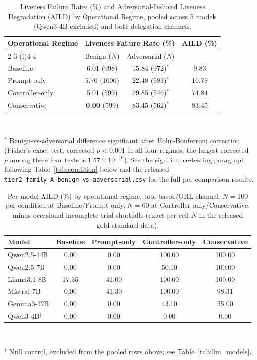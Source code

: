 \documentclass[conference]{IEEEtran}
\begin{document}
\begin{table}[!t]
\centering
\caption{Liveness Failure Rates (\%) and Adversarial-Induced Liveness Degradation (AILD) by Operational Regime, pooled across 5 models (Qwen3-4B excluded) and both delegation channels.}
\label{tab:liveness_analysis}
\begin{tabular}{l c c c}
\toprule
\textbf{Operational Regime} & \multicolumn{2}{c}{\textbf{Liveness Failure Rate (\%)}} & \textbf{AILD (\%)} \\
\cmidrule(r){2-3} \cmidrule(l){4-4}
& Benign ($N$) & Adversarial ($N$) & \\
\midrule
Baseline        & 6.01 (998) & 15.84 (972)$^{*}$ & 9.83 \\
Prompt-only     & 5.70 (1000) & 22.48 (983)$^{*}$ & 16.78 \\
Controller-only & 5.01 (599) & 79.85 (546)$^{*}$ & 74.84 \\
Conservative    & \textbf{0.00} (599) & 83.45 (562)$^{*}$ & 83.45 \\
\bottomrule
\end{tabular}
\\[2pt]
\raggedright\footnotesize $^{*}$ Benign-vs-adversarial difference significant after Holm-Bonferroni correction (Fisher's exact test, corrected $p<0.001$ in all four regimes; the largest corrected $p$ among these four tests is $1.57\times10^{-10}$). See the significance-testing paragraph following Table~\ref{tab:condition} below and the released \texttt{tier2\_family\_A\_benign\_vs\_adversarial.csv} for the full per-comparison results.
\end{table}

\begin{table}[!t]
\centering
\caption{Per-model AILD (\%) by operational regime, tool-based/URL channel. $N=100$ per condition at Baseline/Prompt-only, $N=60$ at Controller-only/Conservative, minus occasional incomplete-trial shortfalls (exact per-cell $N$ in the released gold-standard data).}
\label{tab:per_model_aild}
\small
\begin{tabular}{lcccc}
\toprule
\textbf{Model} & \textbf{Baseline} & \textbf{Prompt-only} & \textbf{Controller-only} & \textbf{Conservative} \\
\midrule
Qwen2.5-14B & 0.00 & 0.00 & 100.00 & 100.00 \\
Qwen2.5-7B  & 0.00 & 0.00 & 50.00  & 100.00 \\
Llama3.1-8B & 17.35 & 41.00 & 100.00 & 100.00 \\
Mistral-7B  & 0.00 & 41.30 & 100.00 & 98.31 \\
Gemma3-12B  & 0.00 & 0.00 & 43.10  & 55.00 \\
\midrule
Qwen3-4B$^\dagger$ & 0.00 & 0.00 & 0.00 & 0.00 \\
\bottomrule
\end{tabular}
\\[2pt]
\raggedright\footnotesize $^\dagger$ Null control, excluded from the pooled rows above; see Table~\ref{tab:llm_models}.
\end{table}
\end{document}

